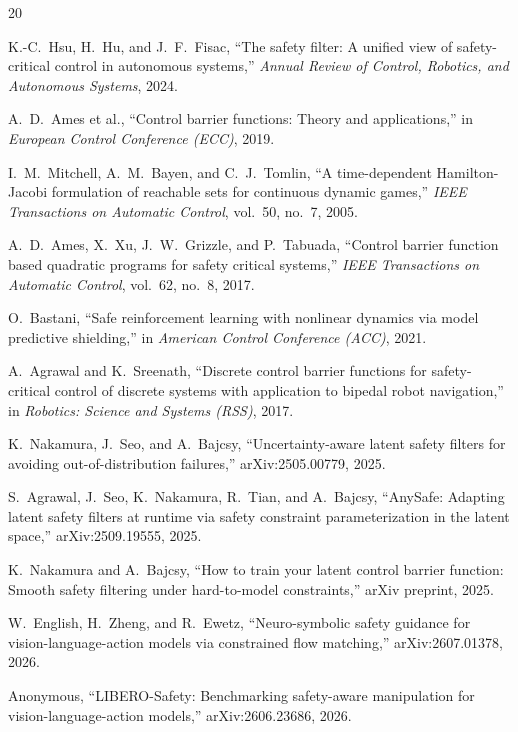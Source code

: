 \documentclass[conference]{IEEEtran}
\begin{document}
\begin{thebibliography}{20}

 K.-C.~Hsu, H.~Hu, and J.~F.~Fisac, ``The safety filter: A unified view of safety-critical control in autonomous systems,'' \emph{Annual Review of Control, Robotics, and Autonomous Systems}, 2024.

 A.~D.~Ames et al., ``Control barrier functions: Theory and applications,'' in \emph{European Control Conference (ECC)}, 2019.

 I.~M.~Mitchell, A.~M.~Bayen, and C.~J.~Tomlin, ``A time-dependent Hamilton-Jacobi formulation of reachable sets for continuous dynamic games,'' \emph{IEEE Transactions on Automatic Control}, vol.~50, no.~7, 2005.

 A.~D.~Ames, X.~Xu, J.~W.~Grizzle, and P.~Tabuada, ``Control barrier function based quadratic programs for safety critical systems,'' \emph{IEEE Transactions on Automatic Control}, vol.~62, no.~8, 2017.

 O.~Bastani, ``Safe reinforcement learning with nonlinear dynamics via model predictive shielding,'' in \emph{American Control Conference (ACC)}, 2021.

 A.~Agrawal and K.~Sreenath, ``Discrete control barrier functions for safety-critical control of discrete systems with application to bipedal robot navigation,'' in \emph{Robotics: Science and Systems (RSS)}, 2017.

 K.~Nakamura, J.~Seo, and A.~Bajcsy, ``Uncertainty-aware latent safety filters for avoiding out-of-distribution failures,'' arXiv:2505.00779, 2025.

 S.~Agrawal, J.~Seo, K.~Nakamura, R.~Tian, and A.~Bajcsy, ``AnySafe: Adapting latent safety filters at runtime via safety constraint parameterization in the latent space,'' arXiv:2509.19555, 2025.

 K.~Nakamura and A.~Bajcsy, ``How to train your latent control barrier function: Smooth safety filtering under hard-to-model constraints,'' arXiv preprint, 2025.

 W.~English, H.~Zheng, and R.~Ewetz, ``Neuro-symbolic safety guidance for vision-language-action models via constrained flow matching,'' arXiv:2607.01378, 2026.

 Anonymous, ``LIBERO-Safety: Benchmarking safety-aware manipulation for vision-language-action models,'' arXiv:2606.23686, 2026.


\end{thebibliography}
\end{document}
